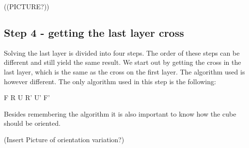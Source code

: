 ((PICTURE?))

\subsection{Step 4 - getting the last layer cross}
Solving the last layer is divided into four steps. The order of these steps can be different and still yield the same result. We start out by getting the cross in the last layer, which is the same as the cross on the first layer. The algorithm used is however different. The only algorithm used in this step is the following:

F R U R' U' F'

Besides remembering the algorithm it is also important to know how the cube should be oriented.

(Insert Picture of orientation variation?)